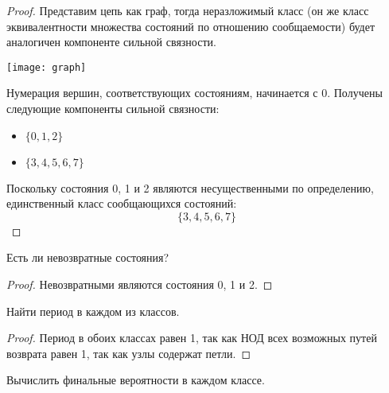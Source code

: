 \begin{proof}
	Представим цепь как граф, тогда неразложимый класс (он же класс эквивалентности множества состояний по отношению сообщаемости) будет аналогичен компоненте сильной связности.
	\begin{center}
		\texttt{[image: graph]}
	\end{center}
	Нумерация вершин, соответствующих состояниям, начинается с 0. Получены следующие компоненты сильной связности:
	\begin{itemize}
		\item $\{0, 1, 2\}$
		\item $\{3, 4, 5, 6, 7\}$
	\end{itemize}
	Поскольку состояния 0, 1 и 2 являются несущественными по определению, единственный класс сообщающихся состояний:
	\[
		\{3, 4, 5, 6, 7\}
	\]
\end{proof}

\begin{problem}
	Есть ли невозвратные состояния?
\end{problem}

\begin{proof}
	Невозвратными являются состояния 0, 1 и 2.
\end{proof}

\begin{problem}
	Найти период в каждом из классов.
\end{problem}

\begin{proof}
	Период в обоих классах равен 1, так как НОД всех возможных путей возврата равен 1, так как узлы содержат петли.
\end{proof}

\begin{problem}
	Вычислить финальные вероятности в каждом классе.
\end{problem}


